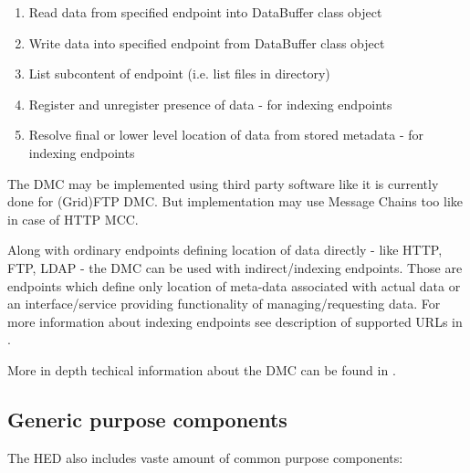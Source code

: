 \documentclass{book}
\begin{document}
\begin{enumerate}

\item Read data from specified endpoint into DataBuffer class object

\item Write data into specified endpoint from DataBuffer class object

\item List subcontent of endpoint (i.e. list files in directory)

\item Register and unregister presence of data - for indexing endpoints

\item Resolve final or lower level location of data from stored metadata - for indexing endpoints

\end{enumerate}

The DMC may be implemented using third party software like it is currently done for (Grid)FTP DMC. But implementation may use Message Chains too like in case of HTTP MCC.

Along with ordinary endpoints defining location of data directly - like HTTP, FTP, LDAP - the DMC can be used with indirect/indexing endpoints. Those are endpoints which define only location of meta-data associated with actual data or an interface/service providing functionality of managing/requesting data. For more information about indexing endpoints see description of supported URLs in \cite{urls}.

More in depth techical information about the DMC can be found in \cite{dmc}.


\subsection{Generic purpose components}

The HED also includes vaste amount of common purpose components:
\end{document}
